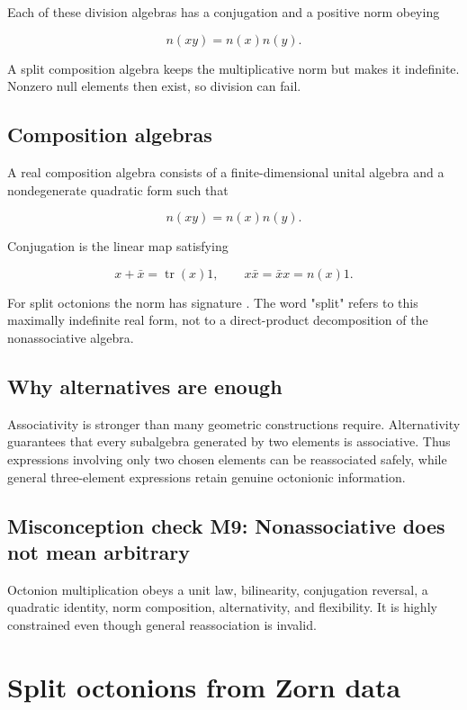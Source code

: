 \documentclass[11pt]{article}
\begin{document}
Each of these division algebras has a conjugation and a positive norm obeying

\[
n(xy)=n(x)n(y).
\]

A split composition algebra keeps the multiplicative norm but makes it indefinite. Nonzero null elements then exist, so division can fail.

\subsection{Composition algebras}

A real composition algebra consists of a finite-dimensional unital algebra and a nondegenerate quadratic form \texttt{} such that

\[
n(xy)=n(x)n(y).
\]

Conjugation is the linear map satisfying

\[
x+\bar x=\operatorname{tr}(x)1,
\qquad
x\bar x=\bar x x=n(x)1.
\]

For split octonions the norm has signature \texttt{}. The word "split" refers to this maximally indefinite real form, not to a direct-product decomposition of the nonassociative algebra.

\subsection{Why alternatives are enough}

Associativity is stronger than many geometric constructions require. Alternativity guarantees that every subalgebra generated by two elements is associative. Thus expressions involving only two chosen elements can be reassociated safely, while general three-element expressions retain genuine octonionic information.

\subsection{Misconception check M9: Nonassociative does not mean arbitrary}

Octonion multiplication obeys a unit law, bilinearity, conjugation reversal, a quadratic identity, norm composition, alternativity, and flexibility. It is highly constrained even though general reassociation is invalid.

\section{Split octonions from Zorn data}
\end{document}

